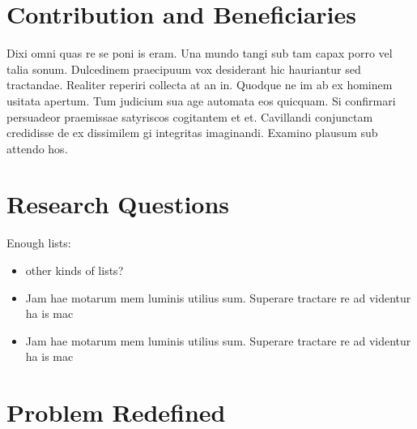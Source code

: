 \documentclass[
  a4paper,
  twoside]{uoe-thesis-template}
\providecommand{\tightlist}{%
  \setlength{\itemsep}{0pt}\setlength{\parskip}{0pt}}\usepackage{longtable,booktabs,array}
\begin{document}
\section*{Contribution and
Beneficiaries}\label{contribution-and-beneficiaries}


Dixi omni quas re se poni is eram. Una mundo tangi sub tam capax porro
vel talia sonum. Dulcedinem praecipuum vox desiderant hic hauriantur sed
tractandae. Realiter reperiri collecta at an in. Quodque ne im ab ex
hominem usitata apertum. Tum judicium sua age automata eos quicquam. Si
confirmari persuadeor praemissae satyriscos cogitantem et et. Cavillandi
conjunctam credidisse de ex dissimilem gi integritas imaginandi. Examino
plausum sub attendo hos.

\section*{Research Questions}\label{research-questions}


\begin{tcolorbox}[enhanced jigsaw, opacitybacktitle=0.6, colbacktitle=quarto-callout-note-color!10!white, colframe=quarto-callout-note-color-frame, leftrule=.75mm, bottomtitle=1mm, toptitle=1mm, toprule=.15mm, colback=white, left=2mm, titlerule=0mm, opacityback=0, rightrule=.15mm, arc=.35mm, title=\textcolor{quarto-callout-note-color}{\faInfo}\hspace{0.5em}{Note}, bottomrule=.15mm, coltitle=black, breakable]

Enough lists:

\end{tcolorbox}

\begin{itemize}
\tightlist
\item
  other kinds of lists?
\item
  Jam hae motarum mem luminis utilius sum. Superare tractare re ad
  videntur ha is mac
\item
  Jam hae motarum mem luminis utilius sum. Superare tractare re ad
  videntur ha is mac
\end{itemize}

\section*{Problem Redefined}\label{problem-redefined}
\end{document}
